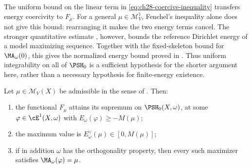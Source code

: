 \begin{remark}
\label{rem:ch28-coercivity-shape}
The uniform bound on the linear term in
\eqref{eq:ch28-coercive-inequality} transfers energy coercivity to
$F_\mu$.  For a general $\mu\in\mathcal M^1_V$, Fenchel's inequality alone
does not give this bound: rearranging it makes the two energy terms
cancel.  The stronger quantitative estimate
\cite[Proposition~2.2, equation~(2.7)]{BJ25FiniteEnergy}, however, bounds
the reference Dirichlet energy of a model maximizing sequence.  Together
with the fixed-skeleton bound for $\MA_\omega(0)$, this gives the
normalized energy bound proved in
.  Thus uniform integrability on
all of $\PSH_0$ is a sufficient hypothesis for the shorter argument here,
rather than a necessary hypothesis for finite-energy existence.
\end{remark}

\begin{theorem}
\label{thm:ch28-existence-admissible}
Let $\mu\in\mathcal M_V(X)$ be admissible in the sense of
.  Then:
\begin{enumerate}
\item\label{itm:ch28-exist:max}
 the functional $F_\mu$ attains its supremum on $\PSH_0(X,\omega)$, at
 some $\varphi\in\cE^1(X,\omega)$ with
 $E_\omega(\varphi)\geq-M(\mu)$;
\item\label{itm:ch28-exist:value}
 the maximum value is $E^\vee_\omega(\mu)\in[0,M(\mu)]$;
\item\label{itm:ch28-exist:equation}
 if in addition $\omega$ has the orthogonality property, then every such
 maximizer satisfies $\MA_\omega(\varphi)=\mu$.
\end{enumerate}
\end{theorem}

